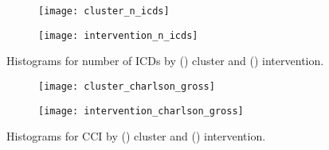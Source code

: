\begin{figure}
    \centering
    \begin{subfigure}{\halfimgwidth}
        \texttt{[image: cluster\_n\_icds]}
        \caption{}\label{fig:cluster_n_icds}
    \end{subfigure}\hfill%
    \begin{subfigure}{\halfimgwidth}
        \texttt{[image: intervention\_n\_icds]}
        \caption{}\label{fig:intervention_n_icds}
    \end{subfigure}
    \caption{%
        Histograms for number of ICDs by () cluster
        and () intervention.
    }\label{fig:n_icds_hist}
\end{figure}

\begin{figure}
    \centering
    \begin{subfigure}{\halfimgwidth}
        \texttt{[image: cluster\_charlson\_gross]}
        \caption{}\label{fig:cluster_charlson}
    \end{subfigure}\hfill%
    \begin{subfigure}{\halfimgwidth}
        \texttt{[image: intervention\_charlson\_gross]}
        \caption{}\label{fig:intervention_charlson}
    \end{subfigure}
    \caption{%
        Histograms for CCI by () cluster and
        () intervention.
    }\label{fig:charlson_hist}
\end{figure}


